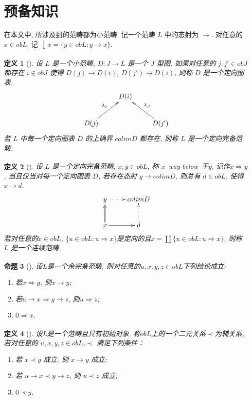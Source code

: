 \documentclass[c5size,a4paper,hyperref,fancyhdr,UTF8,fontset=fandol]{ctexart}
\theoremstyle{nonumberplain}
\newtheorem{definition}{定义}[section]
\newtheorem{proposition}[definition]{命题}
\theoremstyle{nonumberplain}
\newcommand{\upcite}[1]{\textsuperscript{\cite{#1}}}
\begin{document}
\section{预备知识}
\label{sec:introd}

在本文中, 所涉及到的范畴都为小范畴. 记一个范畴 $L$ 中的态射为 $\rightarrow$. 对任意的 $x\in obL$,
记 $\downarrow x=\{y\in obL:y\rightarrow x\}$.

\begin{definition}[\upcite{r4}]
设 $L$ 是一个小范畴, $D:J\rightarrow L$ 是一个 $J$ 型图. 如果对任意的 $j,j'\in obJ$ 都存在 $i\in obJ$ 使得 $D(j)\rightarrow D(i)$, $D(j')\rightarrow D(i)$, 则称 $D$ 是一个定向图表.
$$
\xymatrix{
    &D(i)& \\
    D(j)\ar[ur]^{\lambda_{j}}&&D(j')\ar[ul]_{\lambda_{j'}}
}
$$
若 $L$ 中每一个定向图表 $D$ 的上确界 $colim D$ 都存在, 则称 $L$ 是一个定向完备范畴.
\end{definition}

\begin{definition}[\upcite{r4}]
设 $L$ 是一个定向完备范畴, $x,y\in obL$, 称 $x$~way-below~于$y$, 记作$x\Rightarrow y$, 当且仅当对每一个定向图表 $D$, 若存在态射 $y\rightarrow colim D$, 则总有 $d\in obL$, 使得 $x\rightarrow d$.
$$
\xymatrix{
    y\ar@{.>}[r] & colim D\\
    x\ar@{=>}[u]\ar[r] & d\ar@{.>}[u]}
$$
若对任意的$x\in obL$, $\{u\in obL:u\Rightarrow x\}$是定向的且$x=\coprod\{u\in obL:u\Rightarrow x\}$, 则称 $L$ 是一个连续范畴.
\end{definition}

\begin{proposition}[\upcite{r4}]\label{propos:1}
设$L$是一个余完备范畴, 则对任意的$u,x,y,z\in obL$下列结论成立:
\begin{enumerate}
\item 若$x\Rightarrow y$, 则$x\rightarrow y$;
\item 若$u\rightarrow x\Rightarrow y\rightarrow z$, 则$u\Rightarrow z$;
\item $0\Rightarrow x$.
\end{enumerate}
\end{proposition}

\begin{definition}[\upcite{r4}]
设$L$是一个范畴且具有初始对象, 称$obL$上的一个二元关系$\prec$为辅关系, 若对任意的 $u,x,y,z\in obL$,$\prec$ 满足下列条件：
\begin{enumerate}
\item 若 $x\prec y$ 成立, 则 $x\rightarrow y$ 成立;
\item 若 $u\rightarrow x\prec y\rightarrow z$, 则 $u\prec z$ 成立;
\item $0\prec y$.
\end{enumerate}
\end{definition}
\end{document}
